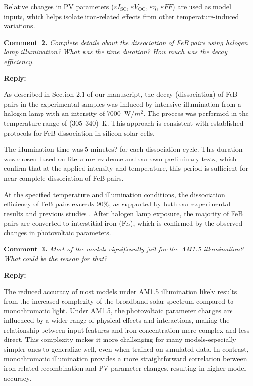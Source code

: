\documentclass[a4paper,fleqn]{cas-sc}
\begin{document}
Relative changes in PV parameters ($\varepsilon I_\mathrm{SC}$, $\varepsilon V_\mathrm{OC}$, $\varepsilon \eta$, $\varepsilon FF$) are used as model inputs, which helps isolate iron-related effects from other temperature-induced variations.

\vspace{1cm}
\noindent
\textcolor[rgb]{0.00,0.50,1.00}{\textbf{Comment~2.}}
\emph{Complete details about the dissociation of FeB pairs using halogen lamp illumination? What was the time duration? How much was the decay efficiency.}

\noindent
\textcolor[rgb]{0.51,0.00,0.00}{\textbf{Reply:}}

As described in Section 2.1 of our manuscript, the decay (dissociation) of FeB pairs in the experimental samples was induced by intensive illumination from a halogen lamp with an intensity of 7000~W/$m^2$.
The process was performed in the temperature range of (305–340)~K.
This approach is consistent with established protocols for FeB dissociation in silicon solar cells.


The illumination time was 5 minutes? for each dissociation cycle.
This duration was chosen based on literature evidence and our own preliminary tests, which confirm that at the applied intensity and temperature, this period is sufficient for near-complete dissociation of FeB pairs.


At the specified temperature and illumination conditions, the dissociation efficiency of FeB pairs exceeds 90\%, as supported by both our experimental results and previous studies \cite{geerligs2004}.
After halogen lamp exposure, the majority of FeB pairs are converted to interstitial iron (Fe$_i$), which is confirmed by the observed changes in photovoltaic parameters.



\vspace{1cm}
\noindent
\textcolor[rgb]{0.00,0.50,1.00}{\textbf{Comment~3.}}
\emph{Most of the models significantly fail for the AM1.5 illumination? What could be the reason for that?}

\noindent
\textcolor[rgb]{0.51,0.00,0.00}{\textbf{Reply:}}

The reduced accuracy of most models under AM1.5 illumination likely results from the increased complexity of the broadband solar spectrum compared to monochromatic light.
Under AM1.5, the photovoltaic parameter changes are influenced by a wider range of physical effects and interactions, making the relationship between input features and iron concentration more complex and less direct.
This complexity makes it more challenging for many models-especially simpler ones-to generalize well, even when trained on simulated data.
In contrast, monochromatic illumination provides a more straightforward correlation between iron-related recombination and PV parameter changes, resulting in higher model accuracy.
\end{document}
